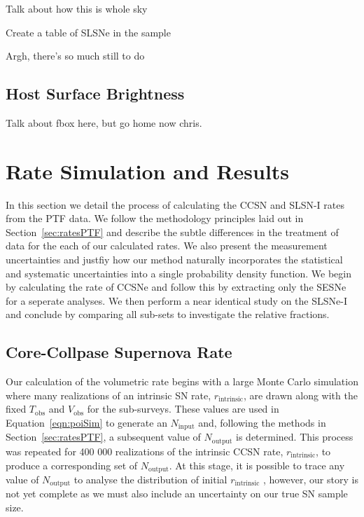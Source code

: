 \documentclass[a4paper,fleqn,usenatbib]{mnras}
\newcommand{\chris}[1]{\color{orange}#1\color{black}}
\begin{document}
Talk about how this is whole sky

Create a table of SLSNe in the sample

\chris{Argh, there's so much still to do}


\subsection{Host Surface Brightness}
\label{sec:fox_distribution}

Talk about fbox here, but go home now chris.


\section{Rate Simulation and Results}
\label{sec:rate_sim}

In this section we detail the process of calculating the CCSN and SLSN-I rates from the PTF data. We follow the methodology principles laid out in Section~\ref{sec:ratesPTF} and describe the subtle differences in the treatment of data for the each of our calculated rates. We also present the measurement uncertainties and justfiy how our method naturally incorporates the statistical and systematic uncertainties into a single probability density function. We begin by calculating the rate of CCSNe and follow this by extracting only the SESNe for a seperate analyses. We then perform a near identical study on the SLSNe-I and conclude by comparing all sub-sets to investigate the relative fractions.

\subsection{Core-Collpase Supernova Rate}
\label{sec:CCSN_Rate}

Our calculation of the volumetric rate begins with a large Monte Carlo simulation where many realizations of an intrinsic SN rate, $r_\mathrm{intrinsic}$, are drawn along with the fixed $T_\mathrm{obs}$ and $V_\mathrm{obs}$ for the sub-surveys. These values are used in Equation~\ref{eqn:poiSim} to generate an $N_\mathrm{input}$ and, following the methods in Section~\ref{sec:ratesPTF}, a subsequent value of $N_\mathrm{output}$ is determined. This process was repeated for 400 000 realizations of the intrinsic CCSN rate, $r_\mathrm{intrinsic}$, to produce a corresponding set of $N_\mathrm{output}$. At this stage, it is possible to trace any value of $N_\mathrm{output}$ to analyse the distribution of initial $r_\mathrm{intrinsic}$ \citep[e.g.][]{Prajs2016}, however, our story is not yet complete as we must also include an uncertainty on our true SN sample size.
\end{document}

